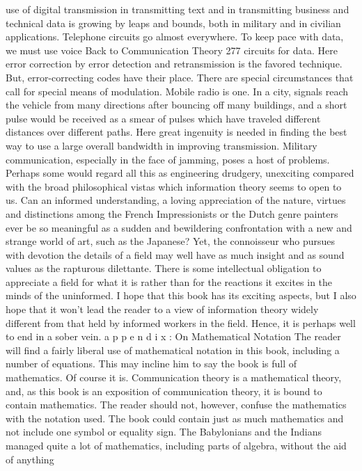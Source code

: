 {{{{{{{{{{{{use of digital transmission in transmitting text and in transmitting
business and technical data is growing by leaps and bounds, both
in military and in civilian applications. Telephone circuits go
almost everywhere. To keep pace with data, we must use voice
Back to Communication Theory
277
circuits for data. Here error correction by error detection and retransmission
is the favored technique. But, error-correcting codes
have their place.
There are special circumstances that call for special means of
modulation. Mobile radio is one. In a city, signals reach the
vehicle from many directions after bouncing off many buildings,
and a short pulse would be received as a smear of pulses which
have traveled different distances over different paths. Here great
ingenuity is needed in finding the best way to use a large overall
bandwidth in improving transmission.
Military communication, especially in the face of jamming, poses
a host of problems.
Perhaps some would regard all this as engineering drudgery,
unexciting compared with the broad philosophical vistas which
information theory seems to open to us. Can an informed understanding,
a loving appreciation of the nature, virtues and distinctions
among the French Impressionists or the Dutch genre
painters ever be so meaningful as a sudden and bewildering confrontation
with a new and strange world of art, such as the
Japanese?
Yet, the connoisseur who pursues with devotion the details of a
field may well have as much insight and as sound values as the
rapturous dilettante. There is some intellectual obligation to
appreciate a field for what it is rather than for the reactions it
excites in the minds of the uninformed. I hope that this book has
its exciting aspects, but I also hope that it won’t lead the reader to
a view of information theory widely different from that held by
informed workers in the field. Hence, it is perhaps well to end
in a sober vein.
a p p e n d i x : On Mathematical
Notation
The reader will find a fairly liberal use of mathematical
notation in this book, including a number of equations. This may
incline him to say the book is full of mathematics.
Of course it is. Communication theory is a mathematical theory,
and, as this book is an exposition of communication theory, it is
bound to contain mathematics. The reader should not, however,
confuse the mathematics with the notation used. The book could
contain just as much mathematics and not include one symbol or
equality sign.
The Babylonians and the Indians managed quite a lot of mathematics,
including parts of algebra, without the aid of anything
}}}}}}}}}}}}
